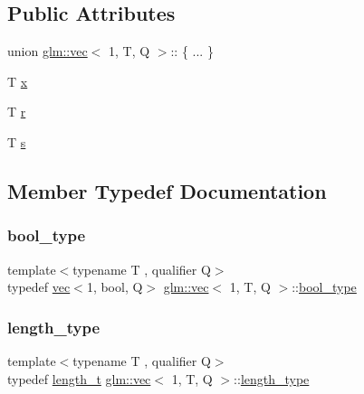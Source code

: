 \subsection*{Public Attributes}
\begin{DoxyCompactItemize}
\item 
union \mbox{\hyperlink{structglm_1_1vec}{glm\+::vec}}$<$ 1, T, Q $>$\+:: \{ ... \}  
\item 
T \mbox{\hyperlink{structglm_1_1vec_3_011_00_01_t_00_01_q_01_4_a81767d72ae05f8cf2e904cc16ce924a2}{x}}
\item 
T \mbox{\hyperlink{structglm_1_1vec_3_011_00_01_t_00_01_q_01_4_ad023565c535d96362539e4a4a21eb34c}{r}}
\item 
T \mbox{\hyperlink{structglm_1_1vec_3_011_00_01_t_00_01_q_01_4_a8369797bacdb23e8720d4967e1cd5af8}{s}}
\end{DoxyCompactItemize}


\subsection{Member Typedef Documentation}
\mbox{\label{structglm_1_1vec_3_011_00_01_t_00_01_q_01_4_abf395a27aa73d1032bd2810013358668}} 
\subsubsection{\texorpdfstring{bool\+\_\+type}{bool\_type}}
{\footnotesize\ttfamily template$<$typename T , qualifier Q$>$ \\
typedef \mbox{\hyperlink{structglm_1_1vec}{vec}}$<$1, bool, Q$>$ \mbox{\hyperlink{structglm_1_1vec}{glm\+::vec}}$<$ 1, T, Q $>$\+::\mbox{\hyperlink{structglm_1_1vec_3_011_00_01_t_00_01_q_01_4_abf395a27aa73d1032bd2810013358668}{bool\+\_\+type}}}

\mbox{\label{structglm_1_1vec_3_011_00_01_t_00_01_q_01_4_a37415eee3b59cf93cdb752a2b30fe5e6}} 
\subsubsection{\texorpdfstring{length\+\_\+type}{length\_type}}
{\footnotesize\ttfamily template$<$typename T , qualifier Q$>$ \\
typedef \mbox{\hyperlink{namespaceglm_a090a0de2260835bee80e71a702492ed9}{length\+\_\+t}} \mbox{\hyperlink{structglm_1_1vec}{glm\+::vec}}$<$ 1, T, Q $>$\+::\mbox{\hyperlink{structglm_1_1vec_3_011_00_01_t_00_01_q_01_4_a37415eee3b59cf93cdb752a2b30fe5e6}{length\+\_\+type}}}




